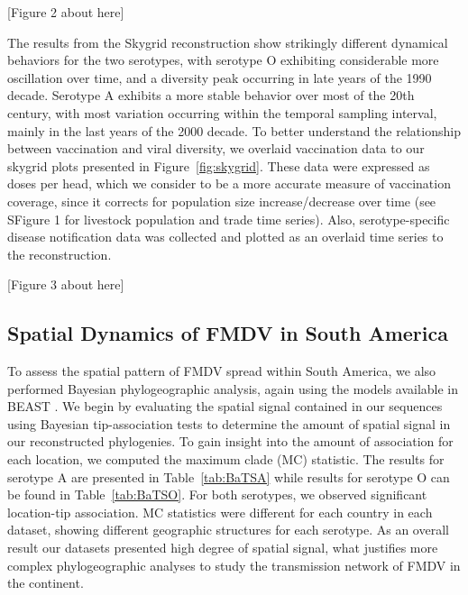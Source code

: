 \documentclass[10pt]{article}
\begin{document}
\begin{center}
 [Figure 2 about here]
\end{center}

The results from the Skygrid reconstruction show strikingly different dynamical behaviors for the two serotypes, with serotype O exhibiting considerable more oscillation over time, and a diversity peak occurring in late years of the 1990 decade. Serotype A exhibits a more stable behavior over most of the 20th century, with most variation occurring within the temporal sampling interval, mainly in the last years of the 2000 decade. To better understand the relationship between vaccination and viral diversity, we overlaid vaccination data to our skygrid plots presented in Figure~\ref{fig:skygrid}. These data were expressed as doses per head, which we consider to be a more accurate measure of vaccination coverage, since it corrects for population size increase/decrease over time (see SFigure 1 for livestock population and trade time series). Also, serotype-specific disease notification data was collected and plotted as an overlaid time series to the reconstruction. 

\begin{center}
 [Figure 3 about here]
\end{center}

\subsection*{Spatial Dynamics of FMDV in South America}

To assess the spatial pattern of FMDV spread within South America, we also performed Bayesian phylogeographic analysis, again using the models available in BEAST \cite{roots}.
We begin by evaluating the spatial signal contained in our sequences using Bayesian tip-association tests \cite{bats} to determine the amount of spatial signal in our reconstructed phylogenies. To gain insight into the amount of association for each location, we computed the maximum clade (MC) statistic.  The results for serotype A are presented in Table~\ref{tab:BaTSA} while results for serotype O can be found in Table~\ref{tab:BaTSO}. For both serotypes, we observed significant location-tip association. MC statistics were different for each country in each dataset, showing different geographic structures for each serotype. As an overall result our datasets presented high degree of spatial signal, what justifies more complex phylogeographic analyses to study the transmission network of FMDV in the continent.
\end{document}
